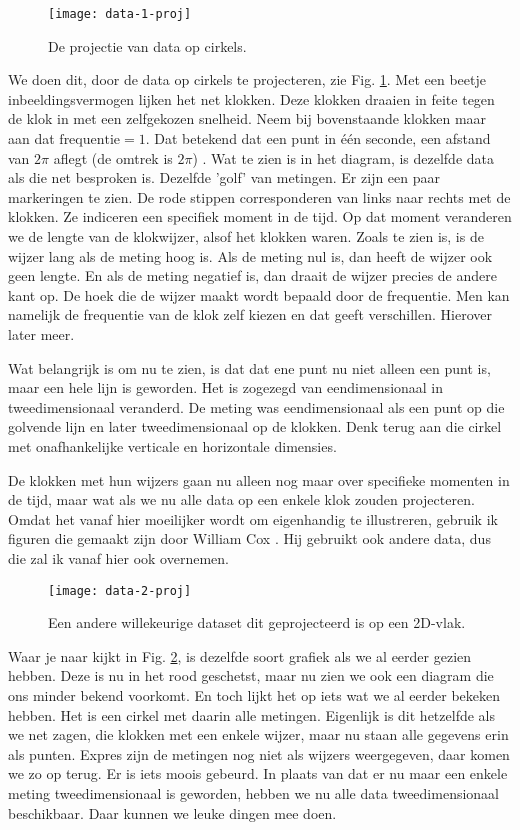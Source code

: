 \documentclass[11pt,fleqn]{book} %
\begin{document}
\begin{figure}[h]
	\centering\texttt{[image: data-1-proj]}
	\caption{De projectie van data op cirkels.}
	\label{fig:data-1-proj}
\end{figure}

We doen dit, door de data op cirkels te projecteren, zie Fig. \ref{fig:data-1-proj}. Met een beetje inbeeldingsvermogen lijken het net klokken. Deze klokken draaien in feite tegen de klok in met een zelfgekozen snelheid. Neem bij bovenstaande klokken maar aan dat $\text{frequentie}=1$. Dat betekend dat een punt in één seconde, een afstand van $2\pi$ aflegt (de omtrek is $2\pi$) . Wat te zien is in het diagram, is dezelfde data als die net besproken is. Dezelfde 'golf' van metingen. Er zijn een paar markeringen te zien. De rode stippen corresponderen van links naar rechts met de klokken. Ze indiceren een specifiek moment in de tijd. Op dat moment veranderen we de lengte van de klokwijzer, alsof het klokken waren. Zoals te zien is, is de wijzer lang als de meting hoog is. Als de meting nul is, dan heeft de wijzer ook geen lengte. En als de meting negatief is, dan draait de wijzer precies de andere kant op. De hoek die de wijzer maakt wordt bepaald door de frequentie. Men kan namelijk de frequentie van de klok zelf kiezen en dat geeft verschillen. Hierover later meer.

Wat belangrijk is om nu te zien, is dat dat ene punt nu niet alleen een punt is, maar een hele lijn is geworden. Het is zogezegd van eendimensionaal in tweedimensionaal veranderd. De meting was eendimensionaal als een punt op die golvende lijn en later tweedimensionaal op de klokken. Denk terug aan die cirkel met onafhankelijke verticale en horizontale dimensies.

De klokken met hun wijzers gaan nu alleen nog maar over specifieke momenten in de tijd, maar wat als we nu alle data op een enkele klok zouden projecteren. Omdat het vanaf hier moeilijker wordt om eigenhandig te illustreren, gebruik ik figuren die gemaakt zijn door William Cox \cite{cox}. Hij gebruikt ook andere data, dus die zal ik vanaf hier ook overnemen.

\begin{figure}[h]
	\centering\texttt{[image: data-2-proj]}
	\caption{Een andere willekeurige dataset dit geprojecteerd is op een 2D-vlak.}
	\label{fig:data-2-proj}
\end{figure}

Waar je naar kijkt in Fig. \ref{fig:data-2-proj}, is dezelfde soort grafiek als we al eerder gezien hebben. Deze is nu in het rood geschetst, maar nu zien we ook een diagram die ons minder bekend voorkomt. En toch lijkt het op iets wat we al eerder bekeken hebben. Het is een cirkel met daarin alle metingen. Eigenlijk is dit hetzelfde als we net zagen, die klokken met een enkele wijzer, maar nu staan alle gegevens erin als punten. Expres zijn de metingen nog niet als wijzers weergegeven, daar komen we zo op terug. Er is iets moois gebeurd. In plaats van dat er nu maar een enkele meting tweedimensionaal is geworden, hebben we nu alle data tweedimensionaal beschikbaar. Daar kunnen we leuke dingen mee doen.
\end{document}

